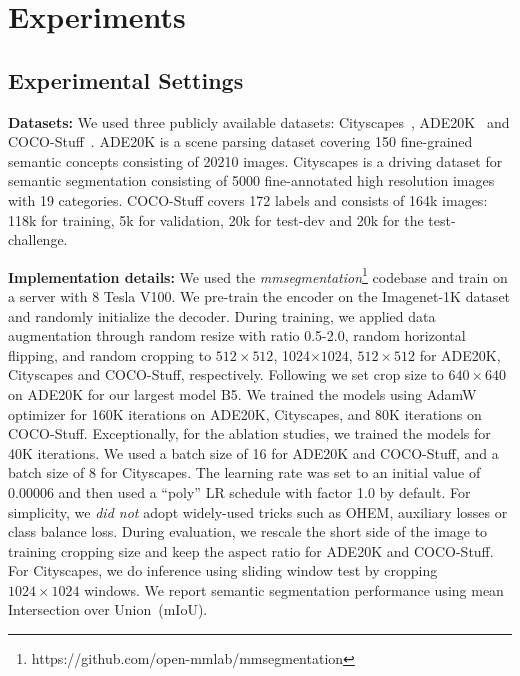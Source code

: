 \section{Experiments} \label{sec:exp}
\subsection{Experimental Settings}
\textbf{Datasets:} We used three publicly available datasets: Cityscapes~\cite{cityscape}, ADE20K~\cite{ade20k} and COCO-Stuff~\cite{cocostuff}. ADE20K is a scene parsing dataset covering 150 fine-grained semantic concepts consisting of 20210 images. Cityscapes is a driving dataset for semantic segmentation consisting of 5000 fine-annotated high resolution images with 19 categories. COCO-Stuff covers 172 labels and consists of 164k images: 118k for training, 5k for validation, 20k for test-dev and 20k for the test-challenge.

\textbf{Implementation details:} We used the \textit{mmsegmentation}\footnote{https://github.com/open-mmlab/mmsegmentation} codebase and train on a server with 8 Tesla V100. We pre-train the encoder on the Imagenet-1K dataset and randomly initialize the decoder. During training, we applied data augmentation through random resize with ratio 0.5-2.0, random horizontal flipping, and random cropping to $512 \times 512$, 1024$ \times 1024$, $512 \times 512$ for ADE20K, Cityscapes and COCO-Stuff, respectively.
Following \cite{liu2021swin} we set crop size to $640 \times 640$ on ADE20K for our largest model B5. We trained the models using AdamW optimizer for 160K iterations on ADE20K, Cityscapes, and 80K iterations on COCO-Stuff. Exceptionally, for the ablation studies, we trained the models for 40K iterations. We used a batch size of 16 for ADE20K and COCO-Stuff, and a batch size of 8 for Cityscapes. The learning rate was set to an initial value of 0.00006 and then used a ``poly'' LR schedule with factor 1.0 by default. For simplicity, we \textit{did not} adopt widely-used tricks such as OHEM, auxiliary losses or class balance loss.
During evaluation, we rescale the short side of the image to training cropping size and keep the aspect ratio for ADE20K and COCO-Stuff. For Cityscapes, we do inference using sliding window test by cropping $1024 \times 1024$ windows. We report semantic segmentation performance using mean Intersection over Union~(mIoU).



